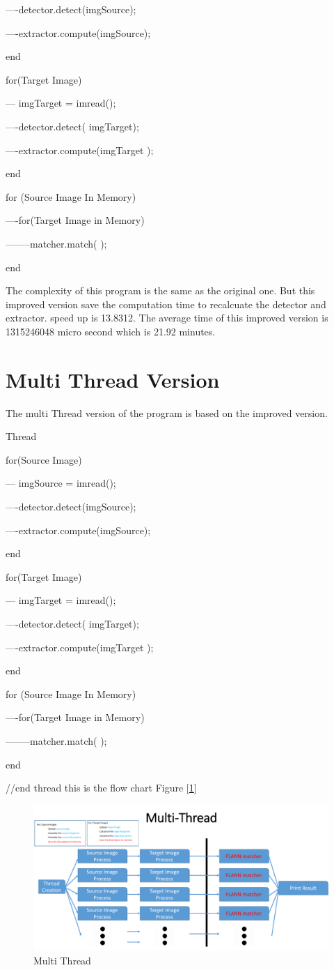\documentclass[journal]{IEEEtran}
\begin{document}
----detector.detect(imgSource);

----extractor.compute(imgSource);

end

for(Target Image)

--- imgTarget = imread();

----detector.detect( imgTarget);

----extractor.compute(imgTarget );

end
	
for (Source Image In Memory)

----for(Target Image in Memory)

--------matcher.match( );

end

The complexity of this program is the same as the original one. But this improved version save the computation time to recalcuate the detector and extractor. 
speed up is 13.8312.
The average time of this improved version is 1315246048 micro second which is 21.92 minutes. 

\section{Multi Thread Version}
The multi Thread version of the program is based on the improved version. 
 
Thread

{
for(Source Image)

--- imgSource = imread();

----detector.detect(imgSource);

----extractor.compute(imgSource);

end

for(Target Image)

--- imgTarget = imread();

----detector.detect( imgTarget);

----extractor.compute(imgTarget );

end
	
for (Source Image In Memory)

----for(Target Image in Memory)

--------matcher.match( );

end

}//end thread
this is the flow chart Figure [\ref{fig:figure13}]

		\begin{figure}[h]
			\centering
			\includegraphics[scale=0.15]{Figure/MultiThread.png}
			\caption{ Multi Thread }
			\label{fig:figure13}
		\end{figure} 
\end{document}
